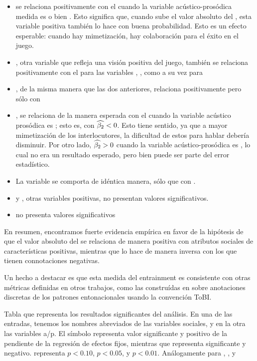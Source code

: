 \begin{itemize}
  \item \svcontributes se relaciona positivamente con el \absentrainment cuando la variable acústico-prosódica medida es \FOMEAN o bien \NOISETOHARMONICS. Esto significa que, cuando sube el valor absoluto del \entrainment, esta variable positiva también lo hace con buena probabilidad. Esto es un efecto esperable: cuando hay mimetización, hay colaboración para el éxito en el juego.
  \item \svclear, otra variable que refleja una visión positiva del juego, también se relaciona positivamente con el \absentrainment para las variables \FOMEAN, \NOISETOHARMONICS, \ENGMAX como a su vez para \PHONAVG
  \item \svengaged, de la misma manera que las dos anteriores, relaciona positivamente pero sólo con \FOMEAN
  \item \svdifficult, se relaciona de la manera esperada con el \absentrainment cuando la variable acústico prosódica es \ENGMAX; esto es, con $\widehat{\beta_2} < 0$. Esto tiene sentido, ya que a mayor mimetización de los interlocutores, la dificultad de estos para hablar debería disminuir. Por otro lado, $\widehat{\beta_2} > 0$ cuando la variable acústico-prosódica es \ENGMEAN, lo cual no era un resultado esperado, pero bien puede ser parte del error estadístico.
  \item La variable \svbored se comporta de idéntica manera, sólo que con \FOMEAN.
  \item \svplanning y \svencourages, otras variables positivas, no presentan valores significativos.
  \item \svdislikes no presenta valores significativos
\end{itemize}


En resumen, encontramos fuerte evidencia empírica en favor de la hipótesis de que el valor absoluto del \entrainment se relaciona de manera positiva con atributos sociales de características positivas, mientras que lo hace de manera inversa con los que tienen connotaciones negativas.

Un hecho a destacar es que esta medida del entrainment es consistente con otras métricas definidas en otros trabajos, como las construídas en \cite{gravano2015backward} sobre anotaciones discretas de los patrones entonacionales usando la convención ToBI\cite{pitrelli1994evaluation}.

\begin{table}[b!]

\caption{Tabla que representa los resultados significantes del análisis. En una de las entradas, tenemos los nombres abreviados de las variables sociales, y en la otra las variables a/p. El símbolo \psl representa valor significante y positivo de la pendiente de la regresión de efectos fijos, mientras que \nsl representa significante y negativo. \psl representa $p < 0.10$, \ppsl $p < 0.05$, y \pppsl $p < 0.01$. Análogamente para \nsl, \nnsl, y \nnnsl }
\label{sign_table}
\end{table}



